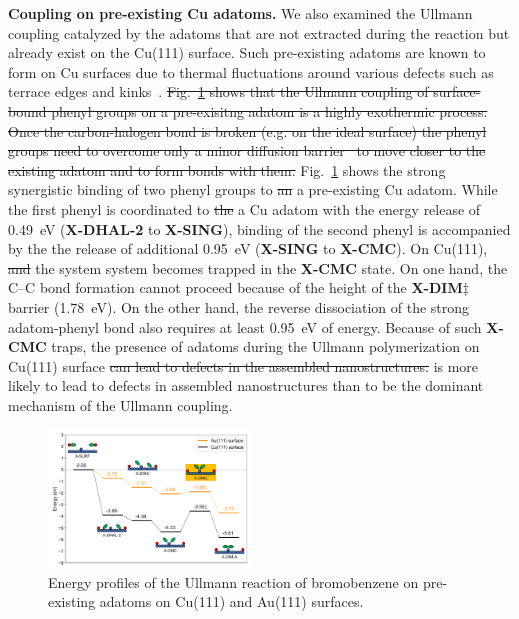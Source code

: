 \documentclass[aps,prb,amsmath,amssymb,11pt]{revtex4-1}
\newcommand{\zhzh}{\color{blue}}
\begin{document}
\textbf{Coupling on {\zhzh pre-}existing Cu adatoms.} We also examined the Ullmann coupling catalyzed by the adatoms that are not extracted during the reaction but already exist on the Cu(111) surface. Such pre-existing adatoms are known to form on Cu surfaces due to thermal fluctuations around various defects such as terrace edges and kinks~\cite{ullmann_175}.
\sout{Fig.~\ref{fig:adatomullmann} shows that the Ullmann coupling of surface-bound phenyl groups on a pre-exisitng adatom is a highly exothermic process. Once the carbon-halogen bond is broken (e.g. on the ideal surface) the phenyl groups need to overcome only a minor diffusion barrier~\cite{pccp2010} to move closer to the existing adatom and to form bonds with them.}
Fig.~\ref{fig:adatomullmann} shows the {\zhzh strong} synergistic binding of two phenyl groups to \sout{an} {\zhzh a pre-existing Cu} adatom. While the first phenyl is coordinated to \sout{the} {\zhzh a Cu} adatom with the energy release of \SI{0.49}{\electronvolt} {\zhzh (\textbf{X-DHAL-2} to \textbf{X-SING})}, binding of the second phenyl is accompanied by the the release of additional \SI{0.95}{\electronvolt} {\zhzh (\textbf{X-SING} to \textbf{X-CMC}). On Cu(111),} \sout{and} the system system becomes trapped in the \textbf{X-CMC} state. On one hand, the C--C bond formation cannot proceed because of the height of the \textbf{X-DIM$\ddagger$} barrier {\zhzh (\SI{1.78}{\electronvolt})}. On the other hand, the reverse dissociation of the strong adatom-phenyl bond also requires at least \SI{0.95}{\electronvolt} of energy. 
Because of such \textbf{X-CMC} traps, the presence of adatoms during the Ullmann polymerization on Cu(111) surface \sout{can lead to defects in the assembled nanostructures.} {\zhzh is more likely to lead to defects in assembled nanostructures than to be the dominant mechanism of the Ullmann coupling.}

\begin{figure}[bt]
\centering
\includegraphics[width=0.48\textwidth]{Fig/ullmann_adatom.pdf}
\caption{Energy profiles of the Ullmann reaction of bromobenzene on pre-existing adatoms on Cu(111) and Au(111) surfaces.}
\label{fig:adatomullmann}
\end{figure}
\end{document}
